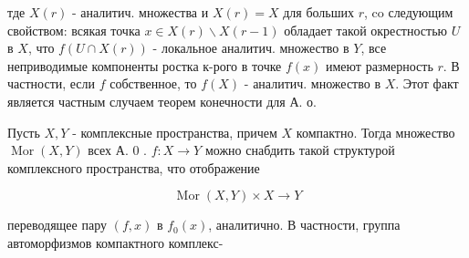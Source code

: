 \documentclass[10pt]{article}
\begin{document}
тде $X(r)$ - аналитич. множества и $X(r)=X$ для больших $r$, co следующим свойством: всякая точка $x \in X(r) \backslash X(r-1)$ обладает такой окрестностью $U$ в $X$, что $f(U \cap X(r))$ - локальное аналитич. множество в $Y$, все неприводимые компоненты ростка к-рого в точке $f(x)$ имеют размерность $r$. В частности, если $f$ собственное, то $f(X)$ - аналитич. множество в $X$. Этот факт является частным случаем теорем конечности для А. о.



Пусть $X, Y$ - комплексные пространства, причем $X$ компактно. Тогда множество $\operatorname{Mor}(X, Y)$ всех А. 0 . $f: X \rightarrow Y$ можно снабдить такой структурой комплексного пространства, что отображение



\[

\operatorname{Mor}(X, Y) \times X \rightarrow Y

\]



переводящее пару $(f, x)$ в $f_{0}(x)$, аналитично. В частности, группа автоморфизмов компактного комплекс-
\end{document}
